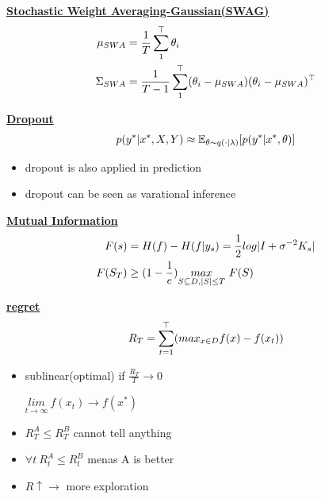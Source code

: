 \documentclass[landscape,a0paper,fontscale=0.285]{baposter} %
\newcommand{\compresslist}{ %
\setlength{\itemsep}{1pt}
\setlength{\parskip}{0pt}
\setlength{\parsep}{0pt}
}
\begin{document}
\begin{poster}
{%
\underline{\textbf{Stochastic Weight Averaging-Gaussian(SWAG)}}
\vspace{-0.3cm}
$$\vspace{-0.3cm}
\begin{aligned}
\mu_{SWA} &= \frac{1}{T}\sum_1^\top \theta_i\\
\Sigma_{SWA} &= \frac{1}{T-1}\sum_1^\top(\theta_i - \mu_{SWA})(\theta_i-\mu_{SWA})^\top
\end{aligned}
$$

\underline{\textbf{Dropout}}
\vspace{-0.3cm}
$$\vspace{-0.2cm}
p(y^*|x^*,X,Y) \approx \mathbb E_{\theta\sim q(\cdot|\lambda)}[p(y^*|x^*,\theta)]
$$
\begin{itemize}\compresslist
    \item dropout is also applied in prediction
    \item dropout can be seen as varational inference
\end{itemize}




\colorbox[HTML]{CCFFFF}{}
\underline{\textbf{Mutual Information}}
\vspace{-0.3cm}
$$\vspace{-0.3cm}
\begin{aligned}
F(s) &= H(f) - H(f|y_s) = \frac{1}{2}log|I+\sigma^{-2}K_s|
\\
F(S_T) &\ge (1-\frac{1}{e})\underset{S\subseteq D,|S|\le T}{max}~F(S)
\end{aligned}
$$

\underline{\textbf{regret}}
\vspace{-0.8cm}
$$\vspace{-0.4cm}
R_T = \sum_{t=1}^\top (max_{x\in D}f(x)-f(x_t))
$$
\begin{itemize}\compresslist
    \item sublinear(optimal) if $\frac{R_T}{T} \rightarrow 0$

    $\underset{t\rightarrow \infty}{lim}~f(x_t)\rightarrow f(x^*)$
    \item $R_T^A \le R_T^B$ cannot tell anything
    \item $\forall t~R_t^A \le R_t^B$ menas A is better
    \item $R\uparrow \rightarrow$ more exploration
\end{itemize}


}
\end{poster}
\end{document}
